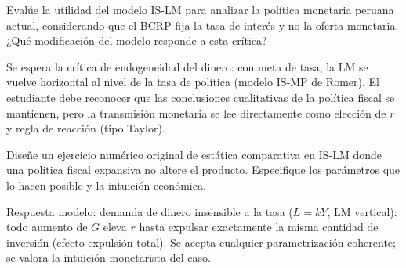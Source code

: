 \documentclass[claves]{academic-exam}
\begin{document}
\begin{pregunta}
Evalúe la utilidad del modelo IS-LM para analizar la política monetaria
peruana actual, considerando que el BCRP fija la tasa de interés y no la
oferta monetaria. ¿Qué modificación del modelo responde a esta crítica?
\begin{solucion}
Se espera la crítica de endogeneidad del dinero: con meta de tasa, la LM
se vuelve horizontal al nivel de la tasa de política (modelo IS-MP de
Romer). El estudiante debe reconocer que las conclusiones cualitativas de
la política fiscal se mantienen, pero la transmisión monetaria se lee
directamente como elección de $r$ y regla de reacción (tipo Taylor).
\end{solucion}
\end{pregunta}

\begin{pregunta}[][Cr · Diseño]
Diseñe un ejercicio numérico original de estática comparativa en IS-LM
donde una política fiscal expansiva no altere el producto. Especifique
los parámetros que lo hacen posible y la intuición económica.
\begin{solucion}
Respuesta modelo: demanda de dinero insensible a la tasa
($L = kY$, LM vertical): todo aumento de $G$ eleva $r$ hasta expulsar
exactamente la misma cantidad de inversión (efecto expulsión total).
Se acepta cualquier parametrización coherente; se valora la intuición
monetarista del caso.
\end{solucion}
\end{pregunta}

\findelexamen
\end{document}
